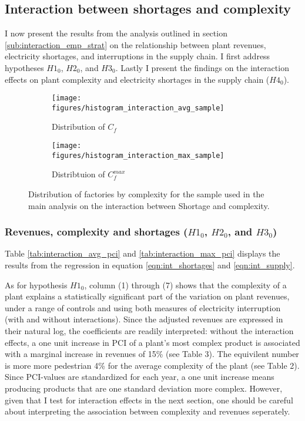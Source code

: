 \documentclass[11pt]{article}
\begin{document}
\subsection{Interaction between shortages and complexity}%
\label{sub:regressions}

I now present the results from the analysis outlined in section \ref{sub:interaction_emp_strat} on the relationship between plant revenues, electricity shortages, and interruptions in the supply chain. I first address hypotheses $H1_0$, $H2_0$, and $H3_0$. Lastly I present the findings on the interaction effects on plant complexity and electricity shortages in the supply chain ($H4_0$).

\begin{figure}
     \centering
     \begin{subfigure}[b]{0.45\textwidth}
         \centering
         \texttt{[image: figures/histogram\_interaction\_avg\_sample]}
	 \caption{Distribution of $C_f$}
         \label{fig:interaction_sample_avg}
     \end{subfigure}
     \hfill
     \begin{subfigure}[b]{0.45\textwidth}
         \centering
         \texttt{[image: figures/histogram\_interaction\_max\_sample]}
	 \caption{Distribtuion of $C^{max}_{f}$}
         \label{fig:interaction_sample_max}
     \end{subfigure}
     \caption[Distribution of factories by complexity in interaction sample]{Distribution of factories by complexity for the sample used in the main analysis on the interaction between Shortage and complexity.}
        \label{fig:interaction_sample}
\end{figure}

\subsubsection{Revenues, complexity and shortages ($H1_0$, $H2_0$, and $H3_0$)}
\label{sub:h123}
Table \ref{tab:interaction_avg_pci} and \ref{tab:interaction_max_pci} displays the results from the regression in equation \ref{eqn:int_shortages} and \ref{eqn:int_supply}.

As for hypothesis $H1_0$, column (1) through (7) shows that the complexity of a plant explains a statistically significant part of the variation on plant revenues, under a range of controls and using both measures of electricity interruption (with and without interactions). Since the adjusted revenues are expressed in their natural log, the coefficients are readily interpreted: without the interaction effects, a one unit increase in PCI of a plant's most complex product is associated with a marginal increase in revenues of 15\% (see Table 3). The equivilent number is more more pedestrian 4\% for the average complexity of the plant (see Table 2). Since PCI-values are standardized for each year, a one unit increase means producing products that are one standard deviation more complex. However, given that I test for interaction effects in the next section, one should be careful about interpreting the association between complexity and revenues seperately. 
\end{document}
